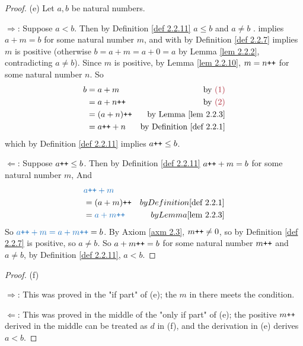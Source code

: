\begin{proof}{(e)}
Let \(a, b\) be natural numbers.

\(\Longrightarrow \): Suppose \(a < b\). Then by Definition \ref{def 2.2.11} \(a \leq b\)  and \(a \neq b\) .  implies \(a + m = b\)  for some natural number \(m\), and with  by Definition \ref{def 2.2.7} implies \(m\) is positive (otherwise \(b = a + m = a + 0 = a\) by Lemma \ref{lem 2.2.2}, contradicting \(a \neq b\)). Since \(m\) is positive, by Lemma \ref{lem 2.2.10}, \(m = n\texttt{++}\)  for some natural number \(n\). So
\begin{align*}
    b & = a + m & \text{by \MAROON{(1)}}\\
      & = a + n\INC & \text{by \MAROON{(2)}}\\
      & = (a + n)\INC & \text{by Lemma \ref{lem 2.2.3}} \\
      & = a\INC + n & \text{by Definition \ref{def 2.2.1}}
\end{align*}
which by Definition \ref{def 2.2.11} implies \(a\texttt{++} \leq b\).

\( \Longleftarrow \): Suppose \(a\texttt{++} \leq b\). Then by Definition \ref{def 2.2.11} \(a\texttt{++} + m = b\) for some natural number \(m\), And
\begin{align*}
    & \BLUE{a\INC + m} \\
    & = (a + m)\INC & by Definition \ref{def 2.2.1} \\
    & = \BLUE{a + m\INC} & by Lemma \ref{lem 2.2.3}
\end{align*}
So \(\BLUE{a\INC + m = a + m\INC} = b\). By Axiom \ref{axm 2.3}, \(m\texttt{++} \neq 0\), so by Definition \ref{def 2.2.7} is positive, so \(a \neq b\). So \(a + m\texttt{++} = b\) for some natural number \(m\texttt{++}\) and \(a \neq b\), by Definition \ref{def 2.2.11}, \(a < b\).
\end{proof}

\begin{proof}{(f)}

\( \Longrightarrow \): This was proved in the "if part" of (e); the \(m\) in there meets the condition.

\( \Longleftarrow \): This was proved in the middle of the "only if part" of (e); the positive \(m\texttt{++}\) derived in the middle can be treated as \(d\) in (f), and the derivation in (e) derives \(a < b\).
\end{proof}

